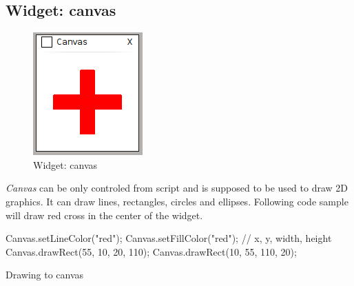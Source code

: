 \documentclass[12pt, a4paper, oneside]{article}
\newcommand{\It}{\textit}  %
\begin{document}
\subsection{Widget: canvas}
\begin{figure}[H]
\begin{center}
\includegraphics[scale=1]{img/w_canvas.png}
\caption{Widget: canvas}
\end{center}
\end{figure}
\It{Canvas} can be only controled from script and is supposed to be used to draw 2D graphics. It can draw lines, rectangles, circles and ellipses. Following code sample will draw red cross in the center of the widget.

\begin{listing}[H]
\begin{jscode}
Canvas.setLineColor("red");
Canvas.setFillColor("red");
// x, y, width, height
Canvas.drawRect(55, 10, 20, 110);
Canvas.drawRect(10, 55, 110, 20);
\end{jscode}
\caption{Drawing to canvas}
\end{listing}
\end{document}

